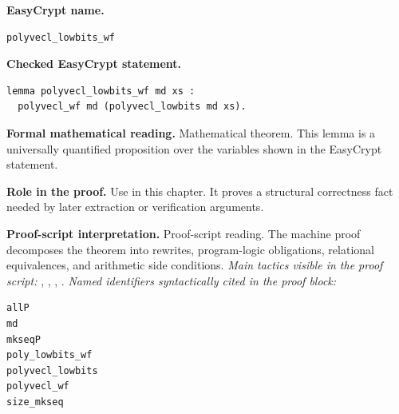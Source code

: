 \begin{formaltheorem}
\noindent\textbf{EasyCrypt name.}
\begin{lstlisting}[language=EasyCrypt,basicstyle=\ttfamily\scriptsize]
polyvecl_lowbits_wf
\end{lstlisting}
\noindent\textbf{Checked EasyCrypt statement.}
\begin{lstlisting}[language=EasyCrypt,basicstyle=\ttfamily\scriptsize]
lemma polyvecl_lowbits_wf md xs :
  polyvecl_wf md (polyvecl_lowbits md xs).
\end{lstlisting}
\noindent\textbf{Formal mathematical reading.}
Mathematical theorem. This lemma is a universally quantified proposition over the variables shown in the EasyCrypt statement.

\noindent\textbf{Role in the proof.}
Use in this chapter. It proves a structural correctness fact needed by later extraction or verification arguments.

\noindent\textbf{Proof-script interpretation.}
Proof-script reading. The machine proof decomposes the theorem into rewrites, program-logic obligations, relational equivalences, and arithmetic side conditions.
\emph{Main tactics visible in the proof script:} , , , .
\emph{Named identifiers syntactically cited in the proof block:}
\begin{lstlisting}[language=EasyCrypt,basicstyle=\ttfamily\scriptsize]
allP
md
mkseqP
poly_lowbits_wf
polyvecl_lowbits
polyvecl_wf
size_mkseq
\end{lstlisting}

\end{formaltheorem}


